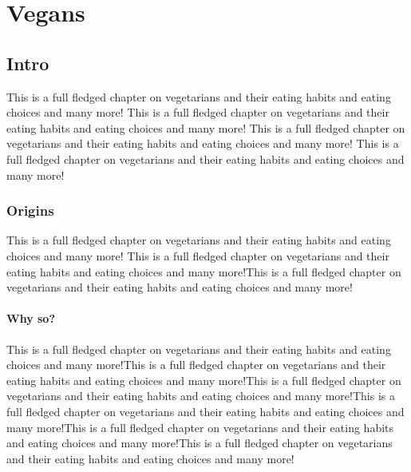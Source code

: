 \documentclass[10pt,a4paper]{report}
\begin{document}
\chapter{Vegans}

\section{Intro}
This is a full fledged chapter on vegetarians and their eating habits and eating choices and many more! This is a full fledged chapter on vegetarians and their eating habits and eating choices and many more! This is a full fledged chapter on vegetarians and their eating habits and eating choices and many more! This is a full fledged chapter on vegetarians and their eating habits and eating choices and many more!
\subsection{Origins} This is a full fledged chapter on vegetarians and their eating habits and eating choices and many more! This is a full fledged chapter on vegetarians and their eating habits and eating choices and many more!This is a full fledged chapter on vegetarians and their eating habits and eating choices and many more!

\subsubsection{Why so?}

This is a full fledged chapter on vegetarians and their eating habits and eating choices and many more!This is a full fledged chapter on vegetarians and their eating habits and eating choices and many more!This is a full fledged chapter on vegetarians and their eating habits and eating choices and many more!This is a full fledged chapter on vegetarians and their eating habits and eating choices and many more!This is a full fledged chapter on vegetarians and their eating habits and eating choices and many more!This is a full fledged chapter on vegetarians and their eating habits and eating choices and many more!
\end{document}
